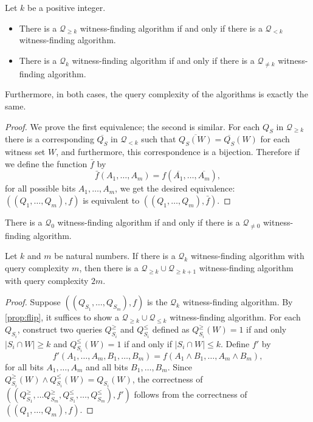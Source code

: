 \documentclass{article}
\newcommand{\mc}{\mathcal}
\begin{document}
\begin{proposition}\label{prop:flip}
  Let $k$ be a positive integer.
  \begin{itemize}
  \item There is a $\mc{Q}_{\geq k}$ witness-finding algorithm if and only if there is a $\mc{Q}_{< k}$ witness-finding algorithm.
  \item There is a $\mc{Q}_k$ witness-finding algorithm if and only if there is a $\mc{Q}_{\neq k}$ witness-finding algorithm.
  \end{itemize}
  Furthermore, in both cases, the query complexity of the algorithms is exactly the same.
\end{proposition}
\begin{proof}
  We prove the first equivalence; the second is similar.
  For each $Q_S$ in $\mc{Q}_{\geq k}$ there is a corresponding $\overline{Q_S}$ in $\mc{Q}_{< k}$ such that $\overline{Q_S(W)} = \overline{Q_S}(W)$ for each witness set $W$, and furthermore, this correspondence is a bijection.
  Therefore if we define the function $\bar{f}$ by
  \begin{equation*}
    \bar{f}(A_1, \dotsc, A_m) = f(\overline{A_1}, \dotsc, \overline{A_m}),
  \end{equation*}
  for all possible bits $A_1, \dotsc, A_m$, we get the desired equivalence: $((Q_1, \dotsc, Q_m), f)$ is equivalent to $((Q_1, \dotsc, Q_m), \bar{f})$.
\end{proof}

\begin{corollary}\label{cor:flip}
  There is a $\mc{Q}_0$ witness-finding algorithm if and only if there is a $\mc{Q}_{\neq 0}$ witness-finding algorithm.
\end{corollary}

\begin{proposition}\label{prop:leqgeq}
  Let $k$ and $m$ be natural numbers.
  If there is a $\mc{Q}_k$ witness-finding algorithm with query complexity $m$, then there is a $\mc{Q}_{\geq k} \cup \mc{Q}_{\geq k + 1}$ witness-finding algorithm with query complexity $2 m$.
\end{proposition}
\begin{proof}
  Suppose $((Q_{S_1}, \dotsc, Q_{S_m}), f)$ is the $\mc{Q}_k$ witness-finding algorithm.
  By \autoref{prop:flip}, it suffices to show a $\mc{Q}_{\geq k} \cup \mc{Q}_{\leq k}$ witness-finding algorithm.
  For each $Q_{S_i}$, construct two queries $Q^\geq_{S_i}$ and $Q^\leq_{S_i}$ defined as $Q^\geq_{S_i}(W) = 1$ if and only $|S_i \cap W| \geq k$ and $Q^\leq_{S_i}(W) = 1$ if and only if $|S_i \cap W| \leq k$.
  Define $f'$ by
  \begin{equation*}
    f'(A_1, \dotsc, A_m, B_1, \dotsc, B_m) = f(A_1 \land B_1, \dotsc, A_m \land B_m),
  \end{equation*}
  for all bits $A_1, \dotsc, A_m$ and all bits $B_1, \dotsc, B_m$.
  Since $Q^\geq_{S_i}(W) \land Q^\leq_{S_i}(W) = Q_{S_i}(W)$, the correctness of $((Q^\geq_{S_1}, \dotsc Q^\geq_{S_m}, Q^\leq_{S_1}, \dotsc, Q^\leq_{S_m}), f')$ follows from the correctness of $((Q_1, \dotsc, Q_m), f)$.
\end{proof}
\end{document}
